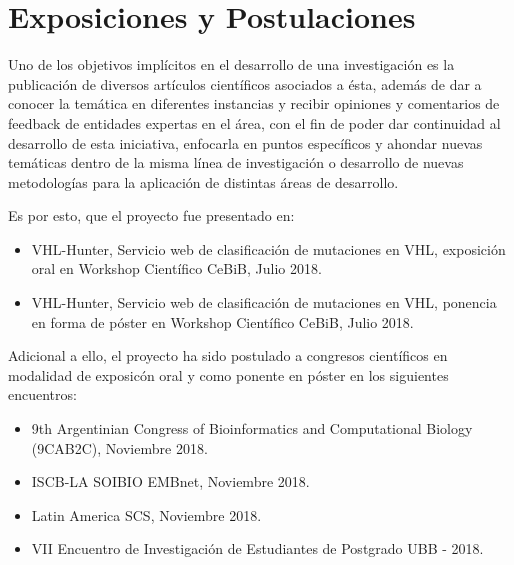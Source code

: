 \chapter{Exposiciones y Postulaciones}


Uno de los objetivos impl\'icitos en el desarrollo de una investigaci\'on es la publicaci\'on de diversos art\'iculos cient\'ificos asociados a \'esta, adem\'as de dar a conocer la tem\'atica en diferentes instancias y recibir opiniones y comentarios de feedback de entidades expertas en el \'area, con el fin de poder dar continuidad al desarrollo de esta iniciativa, enfocarla en puntos espec\'ificos y ahondar nuevas tem\'aticas dentro de la misma l\'inea de investigaci\'on o desarrollo de nuevas metodolog\'ias para la aplicaci\'on de distintas \'areas de desarrollo.

Es por esto, que el proyecto fue presentado en:

\begin{itemize}
	
	\item VHL-Hunter, Servicio web de clasificaci\'on de mutaciones en VHL, exposici\'on oral en Workshop Cient\'ifico CeBiB, Julio 2018.
	\item VHL-Hunter, Servicio web de clasificaci\'on de mutaciones en VHL, ponencia en forma de p\'oster en Workshop Cient\'ifico CeBiB, Julio 2018.
	
\end{itemize}

Adicional a ello, el proyecto ha sido postulado a congresos cient\'ificos en modalidad de exposic\'on oral y como ponente en p\'oster en los siguientes encuentros:

\begin{itemize}
	
	\item 9th Argentinian Congress of Bioinformatics and Computational Biology (9CAB2C), Noviembre 2018.
	
	\item ISCB-LA SOIBIO EMBnet, Noviembre 2018.
	
	\item Latin America SCS, Noviembre 2018.
	
	\item VII Encuentro de Investigaci\'on de Estudiantes de Postgrado UBB - 2018.
\end{itemize}